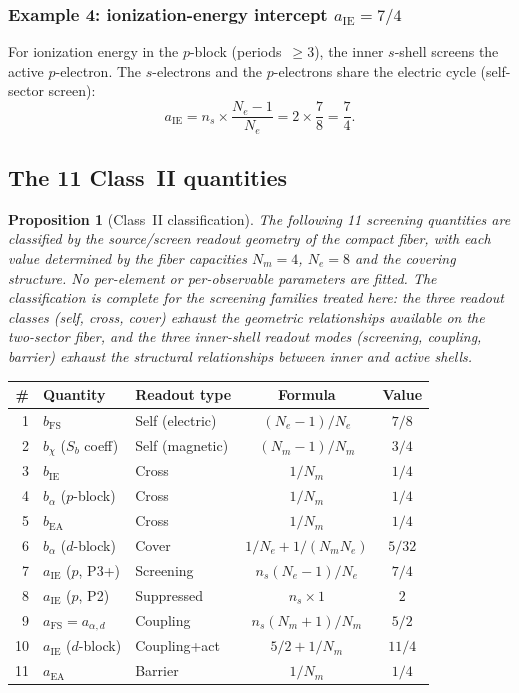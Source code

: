 \documentclass[11pt,a4paper]{article}
\newtheorem{proposition}[theorem]{Proposition}
\begin{document}
\subsubsection*{Example 4: ionization-energy intercept $a_{\mathrm{IE}} = 7/4$}

For ionization energy in the $p$-block (periods~$\geq 3$), the inner $s$-shell screens the active $p$-electron. The $s$-electrons and the $p$-electrons share the electric cycle (self-sector screen):
\[
a_{\mathrm{IE}} = n_s \times \frac{N_e - 1}{N_e} = 2 \times \frac{7}{8} = \frac{7}{4}.
\]

\subsection{The 11 Class~II quantities}

\begin{proposition}[Class~II classification]
\label{prop:class-ii}
The following 11 screening quantities are classified by the source/screen readout geometry of the compact fiber, with each value determined by the fiber capacities $N_m = 4$, $N_e = 8$ and the covering structure. No per-element or per-observable parameters are fitted. The classification is complete for the screening families treated here: the three readout classes (self, cross, cover) exhaust the geometric relationships available on the two-sector fiber, and the three inner-shell readout modes (screening, coupling, barrier) exhaust the structural relationships between inner and active shells.
\end{proposition}

\begin{center}
\renewcommand{\arraystretch}{1.15}
\begin{tabular}{rllcc}
\toprule
\# & Quantity & Readout type & Formula & Value \\
\midrule
1 & $b_{\mathrm{FS}}$ & Self (electric) & $(N_e - 1)/N_e$ & $7/8$ \\
2 & $b_{\chi}$ ($S_b$ coeff) & Self (magnetic) & $(N_m - 1)/N_m$ & $3/4$ \\
3 & $b_{\mathrm{IE}}$ & Cross & $1/N_m$ & $1/4$ \\
4 & $b_{\alpha}$ ($p$-block) & Cross & $1/N_m$ & $1/4$ \\
5 & $b_{\mathrm{EA}}$ & Cross & $1/N_m$ & $1/4$ \\
6 & $b_{\alpha}$ ($d$-block) & Cover & $1/N_e + 1/(N_m N_e)$ & $5/32$ \\
7 & $a_{\mathrm{IE}}$ ($p$, P3+) & Screening & $n_s(N_e - 1)/N_e$ & $7/4$ \\
8 & $a_{\mathrm{IE}}$ ($p$, P2) & Suppressed & $n_s \times 1$ & $2$ \\
9 & $a_{\mathrm{FS}} = a_{\alpha,d}$ & Coupling & $n_s(N_m + 1)/N_m$ & $5/2$ \\
10 & $a_{\mathrm{IE}}$ ($d$-block) & Coupling+act & $5/2 + 1/N_m$ & $11/4$ \\
11 & $a_{\mathrm{EA}}$ & Barrier & $1/N_m$ & $1/4$ \\
\bottomrule
\end{tabular}
\end{center}
\end{document}
